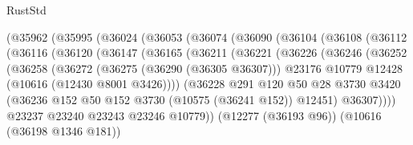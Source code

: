 \begin{lexlean}{RustStd}
\begin{coremodule}
                  (@35962
                    (@35995
                      (@36024
                        (@36053
                          (@36074
                            (@36090
                              (@36104
                                (@36108
                                  (@36112
                                    (@36116
                                      (@36120
                                        (@36147
                                          (@36165
                                            (@36211
                                              (@36221
                                                (@36226
                                                  (@36246
                                                    (@36252
                                                      (@36258
                                                        (@36272
                                                          (@36275 (@36290 (@36305 @36307)))
                                                          @23176
                                                          @10779
                                                          @12428
                                                          (@10616 (@12430 @8001 @3426))))
                                                      (@36228
                                                        @291
                                                        @120
                                                        @50
                                                        @28
                                                        @3730
                                                        @3420
                                                        (@36236
                                                          @152
                                                          @50
                                                          @152
                                                          @3730
                                                          (@10575 (@36241 @152))
                                                          @12451)
                                                        @36307))))
                                                @23237
                                                @23240
                                                @23243
                                                @23246
                                                @10779))
                                            (@12277 (@36193 @96))
                                            (@10616 (@36198 @1346 @181))

\end{coremodule}
\end{lexlean}
